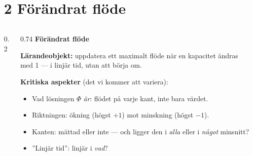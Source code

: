 \documentclass[11pt,aspectratio=169,xcolor=table,t]{beamer}
\newcommand{\uppgiftsbild}[4]{%
\begin{frame}
  \vskip0.5cm
  \begin{columns}[T]
  \begin{column}{0.2\textwidth}
    \raggedleft{\fontsize{70}{70}\selectfont\bfseries\color{kthsky}#1}
  \end{column}
  \begin{column}{0.74\textwidth}
    {\Large\bfseries\color{kthnavy}#2}\par\vskip0.35cm
    {\small\textbf{\color{kthgreen}Lärandeobjekt:} #3}\par\vskip0.25cm
    {\small\textbf{\color{kthgreen}Kritiska aspekter} (det vi kommer att variera):}
    \small #4
  \end{column}
  \end{columns}
\end{frame}}
\begin{document}
\section{2 Förändrat flöde}

\uppgiftsbild{2}{Förändrat flöde}
{uppdatera ett maximalt flöde när en kapacitet ändras med 1 — i linjär tid, utan att börja om.}
{\begin{itemize}\setlength{\itemsep}{1pt}
  \item Vad lösningen $\Phi$ \emph{är}: flödet på varje kant, inte bara värdet.
  \item Riktningen: ökning (högst $+1$) mot minskning (högst $-1$).
  \item Kanten: mättad eller inte — och ligger den i \emph{alla} eller i \emph{något} minsnitt?
  \item ”Linjär tid”: linjär i \emph{vad}?
\end{itemize}}
\end{document}
